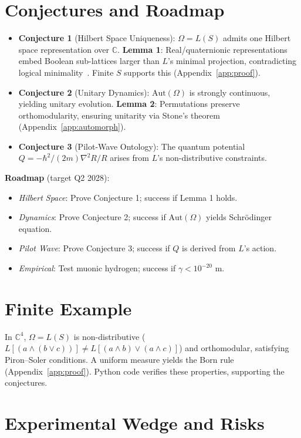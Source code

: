 \documentclass[aps,prx,twocolumn]{revtex4-2}
\begin{document}
\section{Conjectures and Roadmap}
\label{sec:conjectures}
\begin{itemize}
    \item \textbf{Conjecture 1} (Hilbert Space Uniqueness): $\Omega = L(S)$ admits one Hilbert space representation over $\mathbb{C}$. \textbf{Lemma 1}: Real/quaternionic representations embed Boolean sub-lattices larger than $L$’s minimal projection, contradicting logical minimality~\cite{piron1976,soler1995}. Finite $S$ supports this (Appendix~\ref{app:proof}).
    \item \textbf{Conjecture 2} (Unitary Dynamics): $\mathrm{Aut}(\Omega)$ is strongly continuous, yielding unitary evolution. \textbf{Lemma 2}: Permutations preserve orthomodularity, ensuring unitarity via Stone’s theorem~\cite{stone1932} (Appendix~\ref{app:automorph}).
    \item \textbf{Conjecture 3} (Pilot-Wave Ontology): The quantum potential $Q = -\hbar^2/(2m) \nabla^2 R / R$ arises from $L$’s non-distributive constraints.
\end{itemize}
\textbf{Roadmap} (target Q2 2028):
\begin{itemize}
    \item \emph{Hilbert Space}: Prove Conjecture 1; success if Lemma 1 holds.
    \item \emph{Dynamics}: Prove Conjecture 2; success if $\mathrm{Aut}(\Omega)$ yields Schrödinger equation.
    \item \emph{Pilot Wave}: Prove Conjecture 3; success if $Q$ is derived from $L$’s action.
    \item \emph{Empirical}: Test muonic hydrogen; success if $\gamma < 10^{-20}$ m.
\end{itemize}

\section{Finite Example}
\label{sec:finite}
In $\mathbb{C}^4$, $\Omega = L(S)$ is non-distributive ($L[(a \land (b \lor c))] \neq L[(a \land b) \lor (a \land c)]$) and orthomodular, satisfying Piron–Soler conditions. A uniform measure yields the Born rule (Appendix~\ref{app:proof}). Python code verifies these properties, supporting the conjectures.

\section{Experimental Wedge and Risks}
\label{sec:exp}
\end{document}
